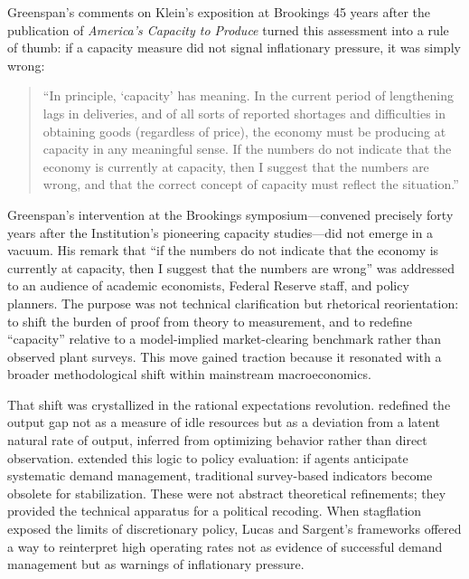 \documentclass[11pt]{article}
\begin{document}
Greenspan's comments on Klein's exposition at Brookings 45 years after the publication of \emph{America's Capacity to Produce} turned this assessment into a rule of thumb: if a capacity measure did not signal inflationary pressure, it was simply wrong:
\begin{quote}
``In principle, `capacity' has meaning. In the current period of lengthening lags in deliveries, and of all sorts of reported shortages and difficulties in obtaining goods (regardless of price), the economy must be producing at capacity in any meaningful sense. If the numbers do not indicate that the economy is currently at capacity, then I suggest that the numbers are wrong, and that the correct concept of capacity must reflect the situation.'' \citep[p.~758]{kleinetal1973}
\end{quote}

Greenspan's intervention at the Brookings symposium---convened precisely forty years after the Institution's pioneering capacity studies---did not emerge in a vacuum. His remark that ``if the numbers do not indicate that the economy is currently at capacity, then I suggest that the numbers are wrong'' \citep[p.~758]{kleinetal1973} was addressed to an audience of academic economists, Federal Reserve staff, and policy planners. The purpose was not technical clarification but rhetorical reorientation: to shift the burden of proof from theory to measurement, and to redefine ``capacity'' relative to a model-implied market-clearing benchmark rather than observed plant surveys. This move gained traction because it resonated with a broader methodological shift within mainstream macroeconomics.

That shift was crystallized in the rational expectations revolution. \citet{lucas1972} redefined the output gap not as a measure of idle resources but as a deviation from a latent natural rate of output, inferred from optimizing behavior rather than direct observation. \citet{sargent1973} extended this logic to policy evaluation: if agents anticipate systematic demand management, traditional survey-based indicators become obsolete for stabilization. These were not abstract theoretical refinements; they provided the technical apparatus for a political recoding. When stagflation exposed the limits of discretionary policy, Lucas and Sargent's frameworks offered a way to reinterpret high operating rates not as evidence of successful demand management but as warnings of inflationary pressure.
\end{document}
